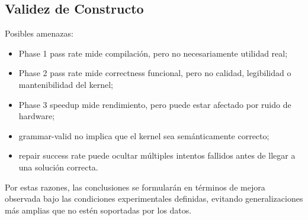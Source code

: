 \documentclass[12pt]{article}
\begin{document}
\subsection{Validez de Constructo}

Posibles amenazas:

\begin{itemize}
    \item Phase 1 pass rate mide compilación, pero no necesariamente utilidad real;
    \item Phase 2 pass rate mide correctness funcional, pero no calidad, legibilidad o mantenibilidad del kernel;
    \item Phase 3 speedup mide rendimiento, pero puede estar afectado por ruido de hardware;
    \item grammar-valid no implica que el kernel sea semánticamente correcto;
    \item repair success rate puede ocultar múltiples intentos fallidos antes de llegar a una solución correcta.
\end{itemize}

Por estas razones, las conclusiones se formularán en términos de mejora observada bajo las condiciones experimentales definidas, evitando generalizaciones más amplias que no estén soportadas por los datos.
\end{document}
